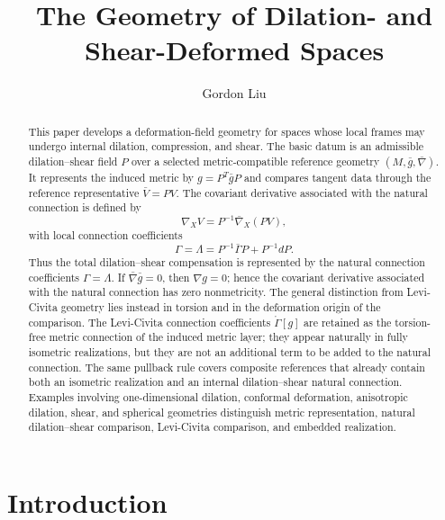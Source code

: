 \documentclass[12pt]{amsart}
\theoremstyle{definition}
\theoremstyle{remark}
\begin{document}
\title{The Geometry of Dilation- and Shear-Deformed Spaces}
\author{Gordon Liu}
\address{Independent Scholar, Melbourne, Australia}


\begin{abstract}
This paper develops a deformation-field geometry for spaces whose local frames may undergo internal dilation, compression, and shear.  The basic datum is an admissible dilation--shear field \(P\) over a selected metric-compatible reference geometry \((M,\bar g,\bar\nabla)\).  It represents the induced metric by \(g=P^T\bar gP\) and compares tangent data through the reference representative \(\bar V=PV\).  The covariant derivative associated with the natural connection is defined by
\[
 \nabla_XV=P^{-1}\bar\nabla_X(PV),
\]
with local connection coefficients
\[
 \Gamma=\Lambda=P^{-1}\bar\Gamma P+P^{-1}dP .
\]
Thus the total dilation--shear compensation is represented by the natural connection coefficients \(\Gamma=\Lambda\).  If \(\bar\nabla\bar g=0\), then \(\nabla g=0\); hence the covariant derivative associated with the natural connection has zero nonmetricity.  The general distinction from Levi-Civita geometry lies instead in torsion and in the deformation origin of the comparison.  The Levi-Civita connection coefficients \(\mathring\Gamma[g]\) are retained as the torsion-free metric connection of the induced metric layer; they appear naturally in fully isometric realizations, but they are not an additional term to be added to the natural connection.  The same pullback rule covers composite references that already contain both an isometric realization and an internal dilation--shear natural connection.  Examples involving one-dimensional dilation, conformal deformation, anisotropic dilation, shear, and spherical geometries distinguish metric representation, natural dilation--shear comparison, Levi-Civita comparison, and embedded realization.
\end{abstract}


\maketitle

\section{Introduction}
\end{document}
